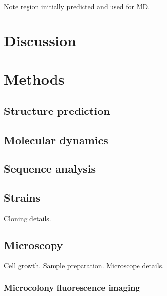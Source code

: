 \documentclass[pdflatex,sn-basic]{sn-jnl}%
\begin{document}
Note region initially predicted and used for MD.

\section{Discussion}

\loremipsum{}

\loremipsum{}

\loremipsum{}

\loremipsum{}




\section{Methods}

\subsection{Structure prediction}

\loremipsum{}

\subsection{Molecular dynamics}

\loremipsum{}

\subsection{Sequence analysis}

\loremipsum{}

\subsection{Strains}

Cloning details.

\loremipsum{} 

\subsection{Microscopy}

Cell growth.
Sample preparation.
Microscope details.

\loremipsum{}

\subsubsection{Microcolony fluorescence imaging}
\end{document}
